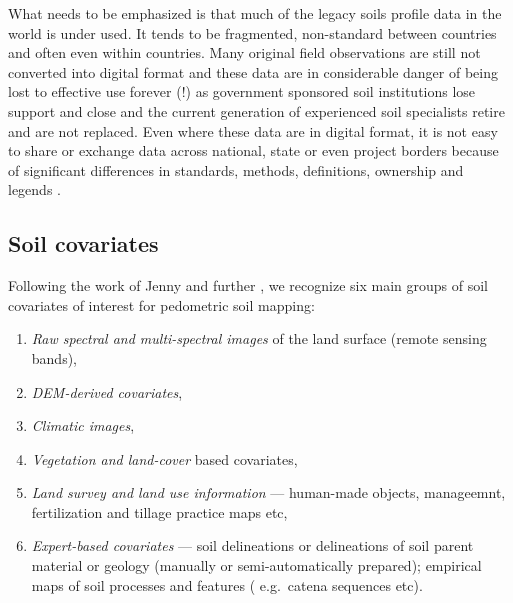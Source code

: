 \documentclass[11pt]{krantz}
\theoremstyle{definition}
\theoremstyle{definition}
\theoremstyle{definition}
\theoremstyle{remark}
\begin{document}
What needs to be emphasized is that much of the legacy soils profile
data in the world is under used. It tends to be fragmented, non-standard
between countries and often even within countries. Many original field
observations are still not converted into digital format and these data
are in considerable danger of being lost to effective use forever (!) as
government sponsored soil institutions lose support and close and the
current generation of experienced soil specialists retire and are not
replaced. Even where these data are in digital format, it is not easy to
share or exchange data across national, state or even project borders
because of significant differences in standards, methods, definitions,
ownership and legends \citep{Omuto2012GSP}.

\hypertarget{soil-covariates}{%
\subsection{Soil covariates}\label{soil-covariates}}

Following the work of Jenny \citep{white2009principles} and further
\citet{McBratney2011HSS}, we recognize six main groups of soil
covariates of interest for pedometric soil mapping:

\begin{enumerate}
\def\labelenumi{\arabic{enumi}.}
\item
  \emph{Raw spectral and multi-spectral images} of the land surface
  (remote sensing bands),
\item
  \emph{DEM-derived covariates},
\item
  \emph{Climatic images},
\item
  \emph{Vegetation and land-cover} based covariates,
\item
  \emph{Land survey and land use information} --- human-made objects,
  manageemnt, fertilization and tillage practice maps etc,
\item
  \emph{Expert-based covariates} --- soil delineations or delineations
  of soil parent material or geology (manually or semi-automatically
  prepared); empirical maps of soil processes and features ( e.g.~catena
  sequences etc).
\end{enumerate}
\end{document}
